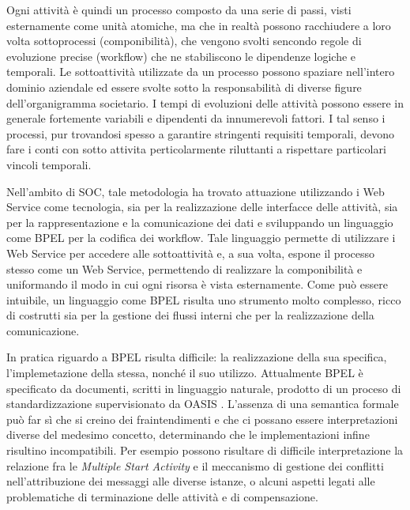 Ogni attività è quindi un processo composto da una serie di passi, visti
esternamente come unità atomiche, ma che in realtà possono racchiudere a loro
volta sottoprocessi (componibilità), che vengono svolti sencondo regole di
evoluzione precise (workflow) che ne stabiliscono le dipendenze logiche e
temporali. Le sottoattività utilizzate da un processo possono spaziare
nell'intero dominio aziendale ed essere svolte sotto la responsabilità di diverse
figure dell'organigramma societario. I tempi di evoluzioni delle attività possono
essere in generale fortemente variabili e dipendenti da innumerevoli fattori. I
tal senso i processi, pur trovandosi spesso a garantire stringenti requisiti
temporali, devono fare i conti con sotto attivita perticolarmente riluttanti a
rispettare particolari vincoli temporali.

Nell'ambito di SOC, tale metodologia ha trovato attuazione utilizzando i Web
Service come tecnologia, sia per la realizzazione delle interfacce delle
attività, sia per la rappresentazione e la comunicazione dei dati e
sviluppando un linguaggio come BPEL \cite{BPEL11Spec} per la codifica dei workflow.
Tale linguaggio permette di utilizzare i Web Service per accedere alle
sottoattività e, a sua volta, espone il processo stesso come un Web Service,
permettendo di realizzare la componibilità e uniformando il modo in cui ogni
risorsa è vista esternamente. Come può essere intuibile, un linguaggio come BPEL
risulta uno strumento molto complesso, ricco di costrutti sia per la gestione
dei flussi interni che per la realizzazione della comunicazione.

In pratica riguardo a BPEL risulta difficile: la realizzazione della sua
specifica, l'implemetazione della stessa, nonché il suo utilizzo. Attualmente
BPEL è specificato da documenti, scritti in linguaggio naturale, prodotto di un proceso
di standardizzazione supervisionato da OASIS \cite{OASISSite}. L'assenza di una
semantica formale può far sì che si creino dei fraintendimenti e che ci possano
essere interpretazioni diverse del medesimo concetto, determinando che le
implementazioni infine risultino incompatibili. Per esempio possono risultare di
difficile interpretazione la relazione fra le \emph{Multiple Start Activity} e
il meccanismo di gestione dei conflitti nell'attribuzione dei messaggi alle
diverse istanze, o alcuni aspetti legati alle problematiche di terminazione
delle attività e di compensazione.

